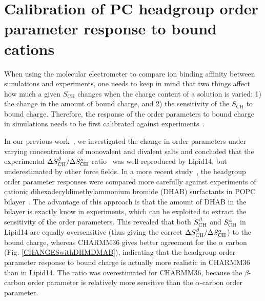 \documentclass[journal=jpcbfk,manuscript=article]{achemso}
\begin{document}
\pagebreak
\section{Calibration of PC headgroup order parameter response to bound cations}\label{electrometerCALIBRATION}
When using the molecular electrometer to compare ion binding affinity between simulations
and experiments, one needs to keep in mind that two things affect how much a given $S_\mathrm{CH}$ changes when the charge content of a solution is varied: 1) the change in the amount of bound charge, and 2) the sensitivity of the $S_\mathrm{CH}$ to bound charge. Therefore, the response of the order parameters to bound charge in simulations needs to be first calibrated
against experiments~\cite{catte16,melcr18}. 

In our previous work~\cite{catte16}, we investigated the change in order parameters under varying concentrations of monovalent and divalent salts and concluded that the experimental $\Delta S_{\rm CH}^\beta / \Delta S_{\rm CH}^\alpha$ ratio~\cite{akutsu81} was well reproduced by Lipid14, but underestimated by other force fields. In a more recent study~\cite{melcr18},
the headgroup order parameter responses were compared more carefully against experiments of
cationic dihexadecyldimethylammonium bromide (DHAB) surfactants in POPC bilayer~\cite{scherer89}. The advantage of this approach is that the amount of DHAB in the bilayer is exactly know in experiments, which can be exploited to extract the sensitivity of the order parameters.
This revealed that both $S_{\rm CH}^\beta$ and $S_{\rm CH}^\alpha$ in Lipid14 are equally oversensitive (thus giving the correct $\Delta S_{\rm CH}^\beta / \Delta S_{\rm CH}^\alpha$) to the bound charge,
whereas CHARMM36 gives better agreement for the $\alpha$ carbon (Fig. \ref{CHANGESwithDHMDMAB}), indicating that the headgroup order parameter response to bound charge is actually more realistic
in CHARMM36 than in Lipid14. The ratio was overestimated for CHARMM36, because the $\beta$-carbon order parameter
is relatively more sensitive than the $\alpha$-carbon order parameter.
\end{document}
